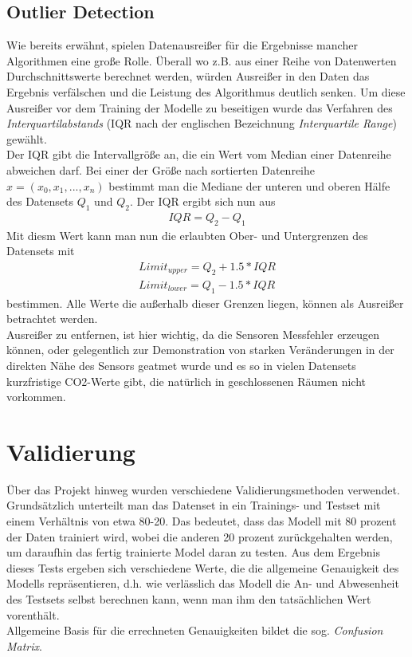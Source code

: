 \subsection{Outlier Detection}
Wie bereits erwähnt, spielen Datenausreißer für die Ergebnisse mancher Algorithmen eine große Rolle. Überall 
wo z.B. aus einer Reihe von Datenwerten Durchschnittswerte berechnet werden, würden Ausreißer in den Daten das 
Ergebnis verfälschen und die Leistung des Algorithmus deutlich senken.
Um diese Ausreißer vor dem Training der Modelle zu beseitigen wurde das Verfahren des 
\textit{Interquartilabstands} (IQR nach der englischen Bezeichnung \textit{Interquartile Range}) gewählt.\\
Der IQR gibt die Intervallgröße an, die ein Wert vom Median einer Datenreihe abweichen darf. Bei einer 
der Größe nach sortierten Datenreihe $x = (x_0,x_1,...,x_n)$ bestimmt man die Mediane der unteren und oberen 
Hälfe des Datensets $Q_1$ und $Q_2$. Der IQR ergibt sich nun aus 
\begin{align}
    IQR = Q_2 - Q_1
\end{align}
Mit diesm Wert kann man nun die erlaubten Ober- und Untergrenzen 
des Datensets mit 
\begin{align}
    Limit_{upper} = Q_2 + 1.5 * IQR \\
    Limit_{lower} = Q_1 - 1.5 * IQR
\end{align} 
bestimmen. Alle Werte die außerhalb dieser Grenzen liegen, können als Ausreißer betrachtet werden.\\
Ausreißer zu entfernen, ist hier wichtig, da die Sensoren Messfehler erzeugen können, oder gelegentlich zur 
Demonstration von starken Veränderungen in der direkten Nähe des Sensors geatmet wurde und es so in vielen 
Datensets kurzfristige CO2-Werte gibt, die natürlich in geschlossenen Räumen nicht vorkommen.

\section{Validierung}
\sloppy
Über das Projekt hinweg wurden verschiedene Validierungsmethoden verwendet. Grundsätzlich unterteilt man das 
Datenset in ein Trainings- und Testset mit einem Verhältnis von etwa 80-20. Das bedeutet, dass das Modell mit
80 prozent der Daten trainiert wird, wobei die anderen 20 prozent zurückgehalten werden, um daraufhin das 
fertig trainierte Model daran zu testen. Aus dem Ergebnis dieses Tests ergeben sich verschiedene Werte, die  
die allgemeine Genauigkeit des Modells repräsentieren, d.h. wie verlässlich das Modell die An- und Abwesenheit 
des Testsets selbst berechnen kann, wenn man ihm den tatsächlichen Wert vorenthält.\\
Allgemeine Basis für die errechneten Genauigkeiten bildet die sog. \textit{Confusion Matrix}.

